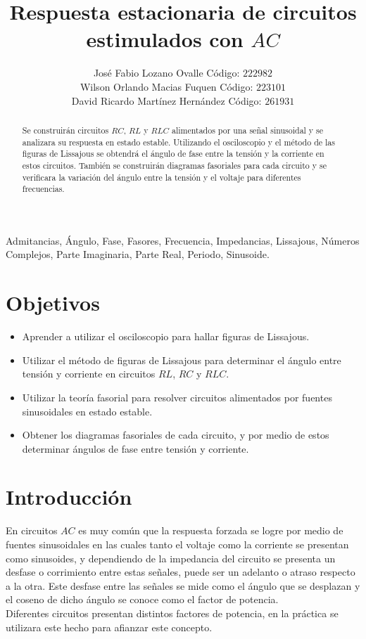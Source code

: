 \documentclass[twocolumn]{IEEEtran}
\begin{document}
\title{Respuesta estacionaria de circuitos estimulados con $AC$}
\author{José Fabio Lozano Ovalle Código: $222982$\\
	Wilson Orlando Macias Fuquen Código: $223101$\\
	David Ricardo Martínez Hernández Código: $261931$}
\maketitle
{}

\begin{abstract}
Se construirán circuitos $RC$, $RL$ y $RLC$ alimentados por una señal sinusoidal y se analizara su respuesta en estado estable. Utilizando el osciloscopio y el método de las figuras de Lissajous se obtendrá  el ángulo de fase entre la tensión y la corriente en estos circuitos. También se construirán diagramas fasoriales para cada circuito y se verificara la variación del ángulo entre la tensión y el voltaje para diferentes frecuencias.
\end{abstract}

\begin{keywords}
Admitancias, Ángulo, Fase, Fasores, Frecuencia, Impedancias, Lissajous, Números Complejos, Parte Imaginaria, Parte Real, Periodo, Sinusoide.
\end{keywords}

\section{Objetivos}
\begin{itemize}
 \item Aprender a utilizar el osciloscopio para hallar figuras de Lissajous.
 \item Utilizar el método de figuras de Lissajous para determinar el ángulo entre tensión y corriente en circuitos $RL$, $RC$ y $RLC$.
 \item Utilizar la teoría fasorial para resolver circuitos alimentados por fuentes sinusoidales en estado estable.
 \item Obtener los diagramas fasoriales de cada circuito, y por medio de estos determinar ángulos de fase entre tensión y corriente.
\end{itemize}

\section{Introducción}
\noindent
En circuitos $AC$ es muy común que la respuesta forzada se logre por medio de fuentes sinusoidales en las cuales tanto el voltaje como la corriente se presentan como sinusoides, y dependiendo de la impedancia del circuito se presenta un desfase o corrimiento entre estas señales, puede ser un adelanto o atraso respecto a la otra. Este desfase entre las señales se mide como el ángulo que se desplazan y el coseno de dicho ángulo se conoce como el factor de potencia.\\
Diferentes circuitos presentan distintos factores de potencia, en la práctica se utilizara este hecho para afianzar este concepto.
\end{document}

